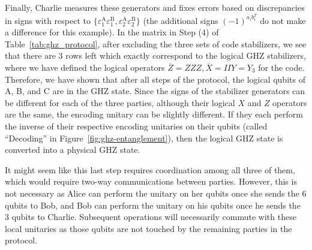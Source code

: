 \documentclass[journal,onecolumn]{IEEEtran}
\begin{document}


Finally, Charlie measures these generators and fixes errors based on discrepancies in signs with respect to $\{ \varepsilon_1^{\text{A}} \varepsilon_1^{\text{B}}, \varepsilon_2^{\text{A}} \varepsilon_2^{\text{B}} \}$ (the additional signs $(-1)^{a_i b_i^T}$ do not make a difference for this example).
In the matrix in Step (4) of Table~\ref{tab:ghz_protocol}, after excluding the three sets of code stabilizers, we see that there are $3$ rows left which exactly correspond to the logical GHZ stabilizers, where we have defined the logical operators $\overline{Z} = ZZZ, \overline{X} = IIY = Y_3$ for the code.
Therefore, we have shown that after all steps of the protocol, the logical qubits of A, B, and C are in the GHZ state.
Since the signs of the stabilizer generators can be different for each of the three parties, although their logical $X$ and $Z$ operators are the same, the encoding unitary can be slightly different.
If they each perform the inverse of their respective encoding unitaries on their qubits (called ``Decoding'' in Figure~\ref{fig:ghz-entanglement}), then the logical GHZ state is converted into a physical GHZ state.

It might seem like this last step requires coordination among all three of them, which would require two-way communications between parties.
However, this is not necessary as Alice can perform the unitary on her qubits once she sends the $6$ qubits to Bob, and Bob can perform the unitary on his qubits once he sends the $3$ qubits to Charlie.
Subsequent operations will necessarily commute with these local unitaries as those qubits are not touched by the remaining parties in the protocol.
\end{document}
